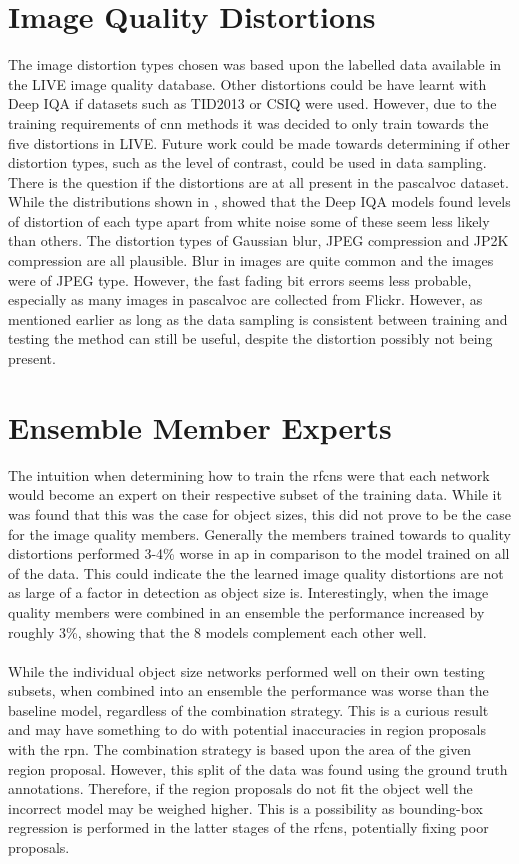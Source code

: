 \section{Image Quality Distortions}
The image distortion types chosen was based upon the labelled data available in the LIVE image quality database. Other distortions could be have learnt with Deep IQA if datasets such as TID2013 \cite{tid2013} or CSIQ \cite{csiq} were used. However, due to the training requirements of \gls{cnn} methods it was decided to only train towards the five distortions in LIVE. Future work could be made towards determining if other distortion types, such as the level of contrast, could be used in data sampling. There is the question if the distortions are at all present in the \gls{pascalvoc} dataset. While the distributions shown in , showed that the Deep IQA models found levels of distortion of each type apart from white noise some of these seem less likely than others. The distortion types of Gaussian blur, JPEG compression and JP2K compression are all plausible. Blur in images are quite common and the images were of JPEG type. However, the fast fading bit errors seems less probable, especially as many images in \gls{pascalvoc} are collected from Flickr. However, as mentioned earlier as long as the data sampling is consistent between training and testing the method can still be useful, despite the distortion possibly not being present.

\section{Ensemble Member Experts}
The intuition when determining how to train the \glspl{rfcn} were that each network would become an expert on their respective subset of the training data. While it was found that this was the case for object sizes, this did not prove to be the case for the image quality members. Generally the members trained towards to quality distortions performed 3-4\% worse in \gls{ap} in comparison to the model trained on all of the data. This could indicate the the learned image quality distortions are not as large of a factor in detection as object size is. Interestingly, when the image quality members were combined in an ensemble the performance increased by roughly 3\%, showing that the 8 models complement each other well. 
\\\\
While the individual object size networks performed well on their own testing subsets, when combined into an ensemble the performance was worse than the baseline model, regardless of the combination strategy. This is a curious result and may have something to do with potential inaccuracies in region proposals with the \gls{rpn}. The combination strategy is based upon the area of the given region proposal. However, this split of the data was found using the ground truth annotations. Therefore, if the region proposals do not fit the object well the incorrect model may be weighed higher. This is a possibility as bounding-box regression is performed in the latter stages of the \glspl{rfcn}, potentially fixing poor proposals. 

